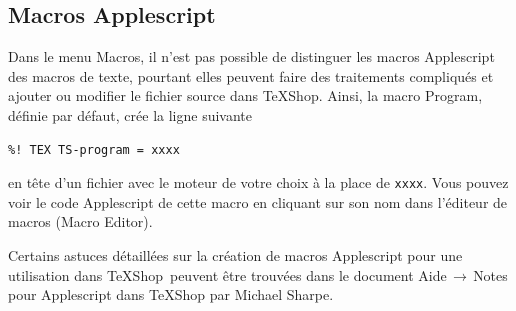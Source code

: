 \documentclass[11pt,french]{article}
\newcommand{\TS}{\textsf{\TeX Shop}}
\newcommand{\cmd}[1]{\textsf{#1}}
\newcommand{\mnu}[1]{\textsf{#1}}
\newcommand{\To}{\,\(\to\)\,}
\newcommand{\selection}{\colorbox{cyan}{\rule[-0.5ex]{0ex}{2.1ex}\texttt{…}}}
\begin{document}
%

\subsection{Macros Applescript}

Dans le menu \mnu{Macros}, il n'est pas possible de distinguer les macros Applescript des macros de texte, pourtant elles peuvent faire des traitements compliqués et ajouter ou modifier le fichier source dans \TS{}. Ainsi, la macro \mnu{Program}, définie par défaut, crée la ligne suivante
\begin{verbatim}
%! TEX TS-program = xxxx
\end{verbatim}
en tête d'un fichier avec le moteur de votre choix à la place de \texttt{xxxx}. Vous pouvez voir le code Applescript de cette macro en cliquant sur son nom dans l'éditeur de macros (\mnu{Macro Editor}). 

Certains astuces détaillées sur la création de macros Applescript pour une utilisation dans \TS\ peuvent être trouvées dans le document \mnu{Aide}\To\mnu{Notes pour Applescript dans TeXShop} par Michael Sharpe.

\end{document}

